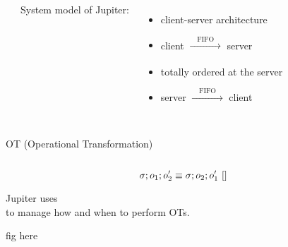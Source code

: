 
\begin{frame}{}
  \centerline{\Huge {}}
\end{frame}

\begin{frame}{}
  \begin{columns}
      \begin{center}
	
      \end{center}
      System model of Jupiter: \\[5pt]
      \begin{itemize}
	\setlength{\itemsep}{10pt}
	\item<1-> client-server architecture
	\item<2-> client $\xrightarrow[]{\quad \text{FIFO} \quad}$ server
	\item<3-> totally ordered at the server
	\item<4-> server $\xrightarrow[]{\quad \text{FIFO} \quad}$ client
      \end{itemize}
  \end{columns}
\end{frame}

\begin{frame}{}
  \centerline{OT (Operational Transformation)~\cite{}}

  \pause
  \begin{columns}
      \begin{center}
	
      \end{center}
      \begin{center}
	
      \end{center}
  \end{columns}
\end{frame}

\begin{frame}{}

  \[
    \sigma; o_1; o_2' \equiv \sigma; o_2; o_1'~\cite{}
  \]
\end{frame}

\begin{frame}{}
  \begin{center}
    {\large Jupiter uses ~\cite{} \\
    to manage how and when to perform OTs.}
  \end{center}

  fig here
\end{frame}

